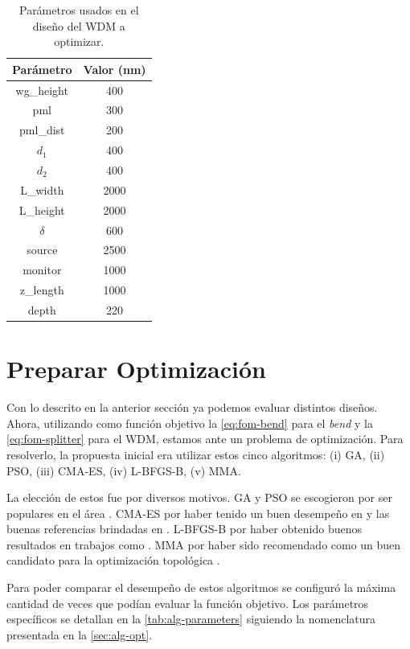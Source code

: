 \begin{table}[ht]
    \centering
    \begin{tabular}{|c|c|}
    \hline 
    Parámetro &  Valor (nm) \\
    \hline 
    wg\_height & 400 \\
    pml & 300 \\
    pml\_dist & 200 \\
    $d_1$ & 400 \\
    $d_2$ & 400 \\
    L\_width & 2000 \\
    L\_height & 2000 \\
    $\delta$ & 600 \\
    source & 2500 \\
    monitor & 1000 \\
    z\_length & 1000 \\
    depth & 220 \\
    \hline 
    \end{tabular}
    \caption{Parámetros usados en el diseño del WDM a optimizar.}
    \label{tab:wdm-values}
\end{table}


\section{Preparar Optimización}

Con lo descrito en la anterior sección ya podemos evaluar distintos diseños.
Ahora, utilizando como función objetivo la \autoref{eq:fom-bend} para el \emph{bend} y 
la \autoref{eq:fom-splitter} para el WDM,
estamos ante un problema de optimización.
Para resolverlo, la propuesta inicial era utilizar estos cinco algoritmos:
(i) GA, (ii) PSO, (iii) CMA-ES, (iv) L-BFGS-B, (v) MMA.

La elección de estos fue por diversos motivos.
GA y PSO se escogieron por ser populares en el área \citep{Elsawy2020, Molesky2018, Prosopio-Galarza2019}.
CMA-ES por haber tenido un buen desempeño en \cite{Gregory2015} y las buenas referencias brindadas en
\cite{Campbell2019}.
L-BFGS-B por haber obtenido buenos resultados en trabajos como \cite{Su2020}.
MMA por haber sido recomendado como un buen candidato para la optimización topológica \citep{Christiansen2021}.

Para poder comparar el desempeño de estos algoritmos se configuró la máxima cantidad de veces que podían
evaluar la función objetivo. Los parámetros específicos se detallan en la
\autoref{tab:alg-parameters} siguiendo la nomenclatura presentada en la \autoref{sec:alg-opt}.

